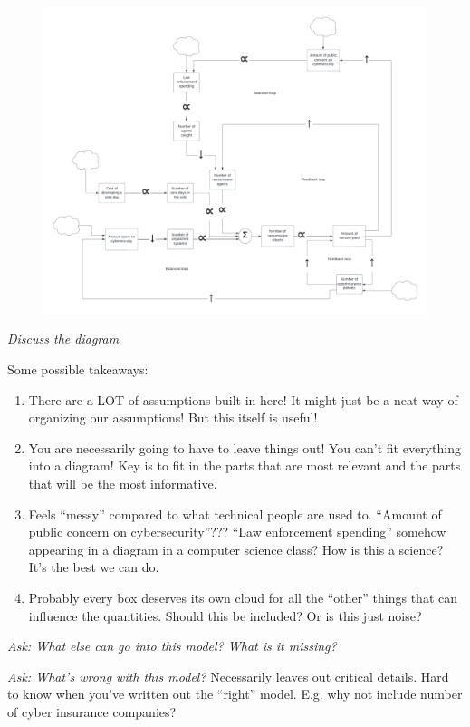 \documentclass[11pt]{article}
\begin{document}
\begin{figure}[h]
    \includegraphics*[width=\textwidth]{ransomware-sys-diagram.pdf}
\end{figure}


{\it Discuss the diagram}

Some possible takeaways:
\begin{enumerate}
    \item There are a LOT of assumptions built in here! It might just be a neat way of organizing our assumptions! But this itself is useful!
    \item You are necessarily going to have to leave things out! You can't fit everything into a diagram! Key is to fit in the parts that are most relevant and the parts that will be the most informative.
    \item Feels ``messy'' compared to what technical people are used to. ``Amount of public concern on cybersecurity''??? ``Law enforcement spending'' somehow appearing in a diagram in a computer science class? How is this a science? It's the best we can do.
    \item Probably every box deserves its own cloud for all the ``other'' things that can influence the quantities. Should this be included? Or is this just noise?
\end{enumerate}

{\it Ask: What else can go into this model? What is it missing?}

{\it Ask: What's wrong with this model?} Necessarily leaves out critical details. Hard to know when you've written out the ``right'' model. E.g. why not include number of cyber insurance companies?
\end{document}
